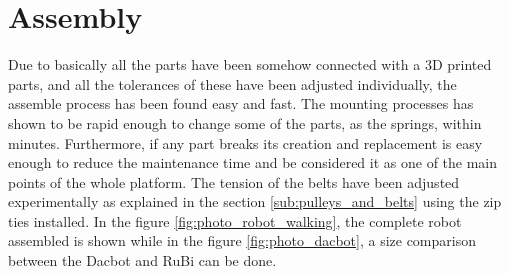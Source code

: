 \section{Assembly} %
\label{sec:assembly}


Due to basically all the parts have been somehow connected with a 3D printed parts, and all the tolerances of these have been adjusted individually, the assemble process has been found easy and fast.
The mounting processes has shown to be rapid enough to change some of the parts, as the springs, within minutes.
Furthermore, if any part breaks its creation and replacement is easy enough to reduce the maintenance time and be considered it as one of the main points of the whole platform.
The tension of the belts have been adjusted experimentally as explained in the section \ref{sub:pulleys_and_belts} using the zip ties installed.
In the figure \ref{fig:photo_robot_walking}, the complete robot assembled is shown while in the figure \ref{fig:photo_dacbot}, a size comparison between the Dacbot \cite{dacbot1} and RuBi can be done.

